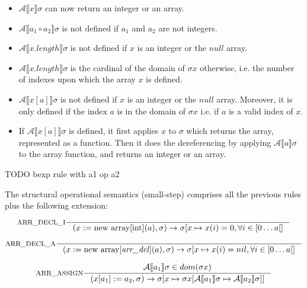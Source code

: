 \documentclass{article}
\begin{document}
\begin{itemize}
\item \(\mathcal{A}\llbracket x \rrbracket \sigma \) can now return an integer or an array.
\item \(\mathcal{A}\llbracket a_1 \circ a_2 \rrbracket \sigma \) is not defined if \(a_1\) and \(a_2\) are not integers.
\item \(\mathcal{A}\llbracket x.length \rrbracket \sigma \) is not defined if \(x\) is an integer or the \(null\) array.
\item \(\mathcal{A}\llbracket x.length \rrbracket \sigma \) is the cardinal of the domain of \(\sigma x\) otherwise, i.e. the number of indexes upon which the array \(x\) is defined.
\item \(\mathcal{A}\llbracket x[a] \rrbracket \sigma \) is not defined if \(x\) is an integer or the \(null\) array. Moreover, it is only defined if the index \(a\) is in the domain of \(\sigma x\) i.e. if \(a\) is a valid index of \(x\).
\item If \(\mathcal{A}\llbracket x[a] \rrbracket \sigma \) is defined, it first applies \(x\) to \(\sigma\) which returns the array, represented as a function. Then it does the dereferencing by applying \(\mathcal{A}\llbracket a \rrbracket \sigma\) to the array function, and returns an integer or an array.
\end{itemize}

TODO bexp rule with a1 op a2

The structural operational semantics (small-step) comprises all the previous rules plus the following extension:
% 

\[
\inference[ARR\_DECL\_I]{}{(x := \text{new array[int]}(a), \sigma) \rightarrow
      \sigma[x \mapsto x(i) = 0, \forall i \in [0 \dots a[ ]}
\]

\[
\inference[ARR\_DECL\_A]{}{(x := \text{new array[} \text{\textit{arr\_dcl}]}(a), \sigma) \rightarrow
      \sigma[x \mapsto x(i) = nil, \forall i \in [0 \dots a[ ]}
\]


\[
\inference[ARR\_ASSIGN]{\mathcal{A}\llbracket a_1\rrbracket \sigma \in dom(\sigma x)}
    {(x[a_1] := a_2, \sigma) \rightarrow
     \sigma[x \mapsto \sigma x[\mathcal{A}\llbracket a_1 \rrbracket \sigma \mapsto \mathcal{A}\llbracket a_2 \rrbracket \sigma]]}
\]
\end{document}
